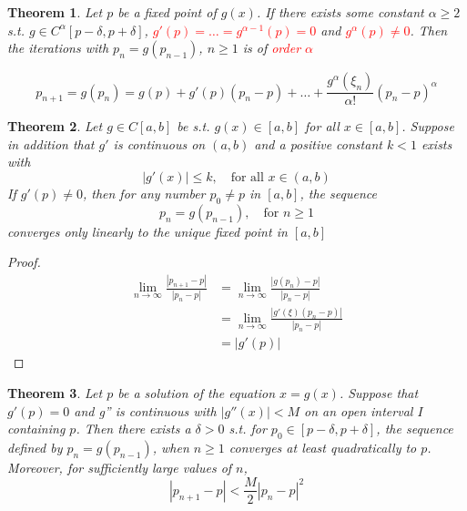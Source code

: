 \documentclass[11pt]{article}
\newtheorem{theorem}{Theorem}[section]
\begin{document}
\begin{theorem}
Let $p$ be a fixed point of $g(x)$. If there exists some constant $\alpha\ge
2$ s.t. $g\in C^\alpha[p-\delta,p+\delta]$,
\textcolor{red}{$g'(p)=\dots=g^{\alpha-1}(p)=0$} and \textcolor{red}{$g^\alpha(p)\neq 0$}.
Then the iterations with $p_n=g(p_{n-1})$, $n\ge1$ is of \textcolor{red}{order $\alpha$}
\end{theorem}

\begin{equation*}
p_{n+1}=g(p_n)=g(p)+g'(p)(p_n-p)+\dots+\frac{g^\alpha(\xi_n)}{\alpha!}(p_n-p)^\alpha
\end{equation*}

\begin{theorem}
Let $g\in C[a,b]$ be s.t. $g(x)\in[a,b]$ for all $x\in[a,b]$. Suppose in
addition that $g'$ is continuous on $(a,b)$ and a positive constant $k<1$
exists with
\begin{equation*}
|g'(x)|\le k, \quad \text{for all } x\in(a,b)
\end{equation*}
If $g'(p)\neq0$, then for any number $p_0\neq p$ in $[a,b]$, the sequence
\begin{equation*}
p_n=g(p_{n-1}),\quad\text{for }n\ge 1
\end{equation*}
converges only linearly to the unique fixed point in $[a,b]$
\end{theorem}

\begin{proof}
\begin{align*}
\lim\limits_{n\to\infty}\frac{|p_{n+1}-p|}{|p_n-p|}&=
\lim\limits_{n\to\infty}\frac{|g(p_n)-p|}{|p_n-p|}\\
&=\lim\limits_{n\to\infty}\frac{|g'(\xi)(p_n-p)|}{|p_n-p|}\\
&=|g'(p)|
\end{align*}
\end{proof}

\begin{theorem}
Let $p$ be a solution of the equation $x=g(x)$. Suppose that $g'(p)=0$ and
g'' is continuous with $|g''(x)|<M$ on an open interval $I$ containing $p$.
Then there exists a $\delta>0$ s.t. for $p_0\in[p-\delta,p+\delta]$, the
sequence defined by $p_n=g(p_{n-1})$, when $n\ge 1$ converges at least
quadratically to $p$. Moreover, for sufficiently large values of $n$,
\begin{equation*}
|p_{n+1}-p|<\frac{M}{2}|p_n-p|^2
\end{equation*}
\end{theorem}
\end{document}
